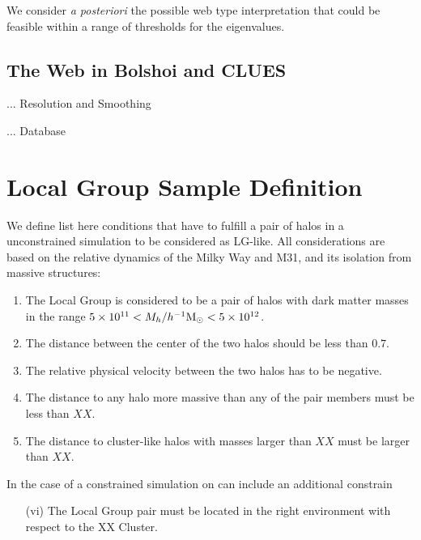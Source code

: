\documentclass[usenatbib]{latex/mn2e}
\begin{document}
We consider \textit{a posteriori} the possible web type interpretation 
that could be feasible within a range of thresholds for the eigenvalues. 


\subsection{The Web in Bolshoi and CLUES}
... Resolution and Smoothing

... Database

\section{Local Group Sample Definition}
\label{section:Def_Samples}


We define list here conditions that have to fulfill a pair of halos in a 
unconstrained simulation to be considered as LG-like. All considerations 
are based on the relative dynamics of the Milky Way and M31, and its 
isolation from massive structures:


\begin{enumerate}
\item{The Local Group is considered to be a pair of halos with dark matter 
masses in the range $5\times10^{11}<M_{h}/\hMsun < 5\times 10^{12}$.}

\item{The distance between the center of the two halos should be less than 
$0.7$\hMpc.}

\item{The relative physical velocity between the two halos has to be 
negative.}

\item{The distance to any halo more massive than any of the pair members 
must be less than $XX$\hMpc.}

\item{The distance to cluster-like halos with masses larger than $XX$\hMpc 
must be larger than $XX$\hMpc.}
\end{enumerate}


In the case of a constrained simulation on can include an additional 
constrain


\begin{enumerate}
\item[(vi)]{The Local Group pair must be located in the right environment 
with respect to the XX Cluster.}
\end{enumerate}
\end{document}
